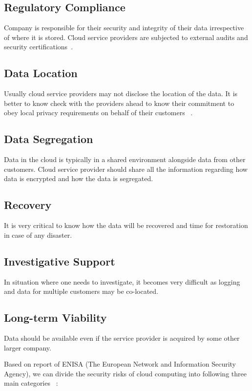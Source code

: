\subsection{Regulatory Compliance}
Company is responsible for their security and integrity of their data 
irrespective of where it is stored. Cloud service providers are subjected
to external audits and security certifications~\cite{hid-sp18-513-gartner}. 

\subsection{Data Location} 
Usually cloud service providers may not disclose the location of the data.
It is better to know check with the providers ahead to know their commitment to
obey local privacy requirements on behalf of their customers
~\cite{hid-sp18-513-gartner}.

\subsection{Data Segregation} 
Data in the cloud is typically in a shared environment alongside data from 
other customers. Cloud service provider should share all the information
regarding how data is encrypted and how the data is segregated.

\subsection{Recovery} 
It is very critical to know how the data will be recovered and time for 
restoration in case of any disaster. 

\subsection{Investigative Support} 
In situation where one needs to investigate, it becomes very difficult 
as logging and data for multiple customers may be co-located.

\subsection{Long-term Viability} 
Data should be available even if the service provider is acquired 
by some other larger company.


Based on report of ENISA (The European Network and Information 
Security Agency), we can divide the security risks of cloud computing
into following three main categories~\cite{hid-sp18-513-enisa} :

